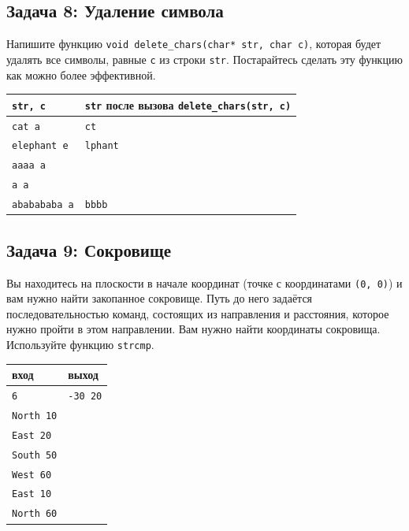 \documentclass{article}
\begin{document}
\subsection*{Задача 8: Удаление символа}
Напишите функцию \texttt{void delete\_chars(char* str, char c)}, которая будет удалять все символы, равные \texttt{c} из строки \texttt{str}. Постарайтесь сделать эту функцию как можно более эффективной.

\begin{center}
\begin{tabular}{ l | l }
 \texttt{str, c} & \texttt{str} после вызова \texttt{delete\_chars(str, c)} \\ \hline
 \texttt{cat a} & \texttt{ct} \\
 \texttt{elephant e} & \texttt{lphant} \\
 \texttt{aaaa a} & \texttt{} \\
 \texttt{a a} & \texttt{} \\
 \texttt{ababababa a} & \texttt{bbbb} \\
\end{tabular}
\end{center}
\subsection*{Задача 9: Сокровище}
Вы находитесь на плоскости в начале координат (точке с координатами \texttt{(0, 0)}) и вам нужно найти закопанное сокровище. Путь до него задаётся последовательностью команд, состоящих из направления и расстояния, которое нужно пройти в этом направлении. Вам нужно найти координаты сокровища. Используйте функцию \texttt{strcmp}.
\begin{center} 
\begin{tabular}{ l | l }
 вход & выход \\ \hline
 \texttt{6} & \texttt{-30 20}\\
 \texttt{North 10} & \\
 \texttt{East 20} &\\
 \texttt{South 50} &\\
 \texttt{West 60} &\\
 \texttt{East 10} &\\
 \texttt{North 60} &\\
\end{tabular}
\end{center}
\end{document}
